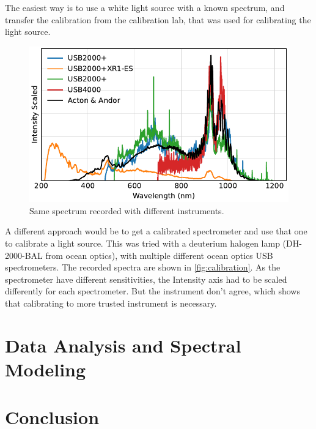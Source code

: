 \documentclass[
	parskip=half,
	a4paper,
]{scrarticle}
\begin{document}
The easiest way is to use a white light source with a known spectrum, and transfer the calibration from the calibration lab, that was used for calibrating the light source.

\begin{figure}[hb]
    \centering
    \includegraphics{../analysis/figures/efficiency_different.pdf}
    \caption{Same spectrum recorded with different instruments.}
    \label{fig:calibration}
\end{figure}
A different approach would be to get a calibrated spectrometer and use that one to calibrate a light source. This was tried with a deuterium halogen lamp (DH-2000-BAL from ocean optics), with multiple different ocean optics USB spectrometers.
The recorded spectra are shown in \autoref{fig:calibration}. 
As the spectrometer have different sensitivities, the Intensity axis had to be scaled differently for each spectrometer. But the instrument don't agree, which shows that calibrating to more trusted instrument is necessary.



\clearpage
\section{Data Analysis and Spectral Modeling}

\clearpage
\section{Conclusion}

\clearpage
\printbibliography
\end{document}
